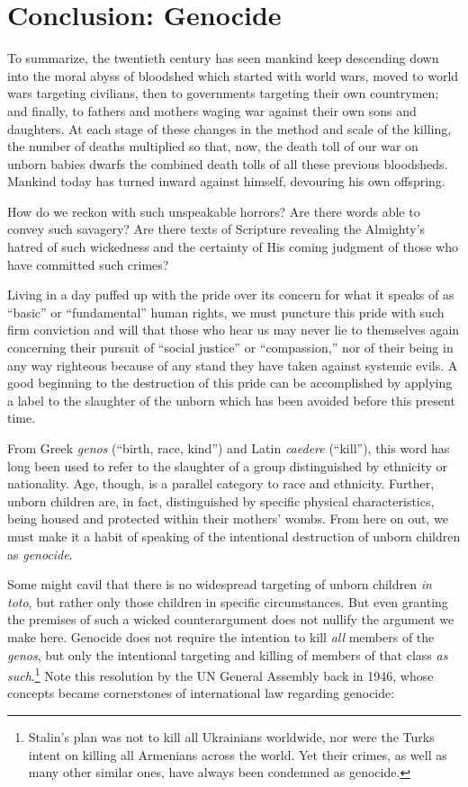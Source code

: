 \documentclass[
]{book}
\begin{document}
\hypertarget{conclusion-genocide}{%
\section{Conclusion: Genocide}\label{conclusion-genocide}}

To summarize, the twentieth century has seen mankind keep descending down into the moral abyss of bloodshed which started with world wars, moved to world wars targeting civilians, then to governments targeting their own countrymen; and finally, to fathers and mothers waging war against their own sons and daughters. At each stage of these changes in the method and scale of the killing, the number of deaths multiplied so that, now, the death toll of our war on unborn babies dwarfs the combined death tolls of all these previous bloodsheds. Mankind today has turned inward against himself, devouring his own offspring.

How do we reckon with such unspeakable horrors? Are there words able to convey such savagery? Are there texts of Scripture revealing the Almighty's hatred of such wickedness and the certainty of His coming judgment of those who have committed such crimes?

Living in a day puffed up with the pride over its concern for what it speaks of as ``basic'' or ``fundamental'' human rights, we must puncture this pride with such firm conviction and will that those who hear us may never lie to themselves again concerning their pursuit of ``social justice'' or ``compassion,'' nor of their being in any way righteous because of any stand they have taken against systemic evils. A good beginning to the destruction of this pride can be accomplished by applying a label to the slaughter of the unborn which has been avoided before this present time.

From Greek \emph{genos} (``birth, race, kind'') and Latin \emph{caedere} (``kill''), this word has long been used to refer to the slaughter of a group distinguished by ethnicity or nationality. Age, though, is a parallel category to race and ethnicity. Further, unborn children are, in fact, distinguished by specific physical characteristics, being housed and protected within their mothers' wombs. From here on out, we must make it a habit of speaking of the intentional destruction of unborn children as \emph{genocide}.

Some might cavil that there is no widespread targeting of unborn children \emph{in toto}, but rather only those children in specific circumstances. But even granting the premises of such a wicked counterargument does not nullify the argument we make here. Genocide does not require the intention to kill \emph{all} members of the \emph{genos}, but only the intentional targeting and killing of members of that class \emph{as such}.\footnote{Stalin's plan was not to kill all Ukrainians worldwide, nor were the Turks intent on killing all Armenians across the world. Yet their crimes, as well as many other similar ones, have always been condemned as genocide.} Note this resolution by the UN General Assembly back in 1946, whose concepts became cornerstones of international law regarding genocide:
\end{document}
